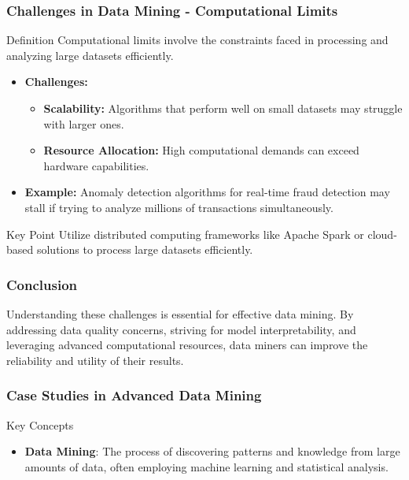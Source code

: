 \documentclass{beamer}
\begin{document}
\begin{frame}[fragile]
    \frametitle{Challenges in Data Mining - Computational Limits}
    \begin{block}{Definition}
        Computational limits involve the constraints faced in processing and analyzing large datasets efficiently.
    \end{block}
    \begin{itemize}
        \item \textbf{Challenges:}
        \begin{itemize}
            \item \textbf{Scalability:} Algorithms that perform well on small datasets may struggle with larger ones.
            \item \textbf{Resource Allocation:} High computational demands can exceed hardware capabilities.
        \end{itemize}
        \item \textbf{Example:} Anomaly detection algorithms for real-time fraud detection may stall if trying to analyze millions of transactions simultaneously.
    \end{itemize}
    \begin{block}{Key Point}
        Utilize distributed computing frameworks like Apache Spark or cloud-based solutions to process large datasets efficiently.
    \end{block}
\end{frame}

\begin{frame}[fragile]
    \frametitle{Conclusion}
    Understanding these challenges is essential for effective data mining. By addressing data quality concerns, striving for model interpretability, and leveraging advanced computational resources, data miners can improve the reliability and utility of their results.
\end{frame}

\begin{frame}[fragile]
    \frametitle{Case Studies in Advanced Data Mining}
    \begin{block}{Key Concepts}
        \begin{itemize}
            \item \textbf{Data Mining}: The process of discovering patterns and knowledge from large amounts of data, often employing machine learning and statistical analysis.
        \end{itemize}
    \end{block}
\end{frame}
\end{document}
